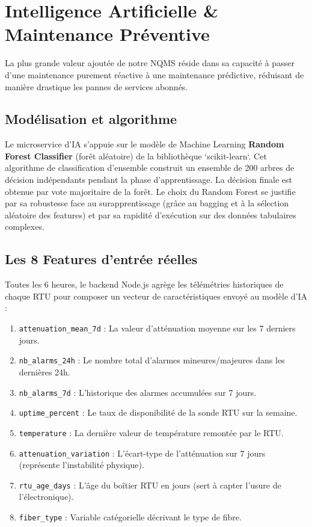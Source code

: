 \documentclass[11pt,a4paper]{article}
\begin{document}
\newpage

\section{Intelligence Artificielle \& Maintenance Préventive}
La plus grande valeur ajoutée de notre NQMS réside dans sa capacité à passer d'une maintenance purement réactive à une maintenance prédictive, réduisant de manière drastique les pannes de services abonnés.

\subsection{Modélisation et algorithme}
Le microservice d'IA s'appuie sur le modèle de Machine Learning \textbf{Random Forest Classifier} (forêt aléatoire) de la bibliothèque `scikit-learn`. Cet algorithme de classification d'ensemble construit un ensemble de 200 arbres de décision indépendants pendant la phase d'apprentissage. La décision finale est obtenue par vote majoritaire de la forêt. Le choix du Random Forest se justifie par sa robustesse face au surapprentissage (grâce au bagging et à la sélection aléatoire des features) et par sa rapidité d'exécution sur des données tabulaires complexes.

\subsection{Les 8 Features d'entrée réelles}
Toutes les 6 heures, le backend Node.js agrège les télémétries historiques de chaque RTU pour composer un vecteur de caractéristiques envoyé au modèle d'IA :
\begin{enumerate}
    \item \texttt{attenuation\_mean\_7d} : La valeur d'atténuation moyenne sur les 7 derniers jours.
    \item \texttt{nb\_alarms\_24h} : Le nombre total d'alarmes mineures/majeures dans les dernières 24h.
    \item \texttt{nb\_alarms\_7d} : L'historique des alarmes accumulées sur 7 jours.
    \item \texttt{uptime\_percent} : Le taux de disponibilité de la sonde RTU sur la semaine.
    \item \texttt{temperature} : La dernière valeur de température remontée par le RTU.
    \item \texttt{attenuation\_variation} : L'écart-type de l'atténuation sur 7 jours (représente l'instabilité physique).
    \item \texttt{rtu\_age\_days} : L'âge du boîtier RTU en jours (sert à capter l'usure de l'électronique).
    \item \texttt{fiber\_type} : Variable catégorielle décrivant le type de fibre.
\end{enumerate}
\end{document}
